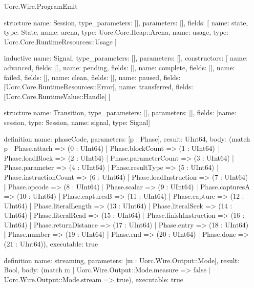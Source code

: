 \begin{lexlean}{Uorc.Wire.ProgramEmit}
\begin{semanticmodule}
structure{
  name: Session,
  type_parameters: [],
  parameters: [],
  fields: [
    {name: state, type: State},
    {name: arena, type: Uorc.Core.Heap::Arena},
    {name: usage, type: Uorc.Core.RuntimeResources::Usage}
  ]
}

inductive{
  name: Signal,
  type_parameters: [],
  parameters: [],
  constructors: [
    {name: advanced, fields: []},
    {name: pending, fields: []},
    {name: complete, fields: []},
    {name: failed, fields: []},
    {name: clean, fields: []},
    {name: paused, fields: [Uorc.Core.RuntimeResources::Error]},
    {name: transferred, fields: [Uorc.Core.RuntimeValue::Handle]}
  ]
}

structure{
  name: Transition,
  type_parameters: [],
  parameters: [],
  fields: [{name: session, type: Session}, {name: signal, type: Signal}]
}

definition{
  name: phaseCode,
  parameters: [p : Phase],
  result: UInt64,
  body: (match p
    | Phase.attach => (0 : UInt64)
    | Phase.blockCount => (1 : UInt64)
    | Phase.loadBlock => (2 : UInt64)
    | Phase.parameterCount => (3 : UInt64)
    | Phase.parameter => (4 : UInt64)
    | Phase.resultType => (5 : UInt64)
    | Phase.instructionCount => (6 : UInt64)
    | Phase.loadInstruction => (7 : UInt64)
    | Phase.opcode => (8 : UInt64)
    | Phase.scalar => (9 : UInt64)
    | Phase.capturesA => (10 : UInt64)
    | Phase.capturesB => (11 : UInt64)
    | Phase.capture => (12 : UInt64)
    | Phase.literalLength => (13 : UInt64)
    | Phase.literalSeek => (14 : UInt64)
    | Phase.literalRead => (15 : UInt64)
    | Phase.finishInstruction => (16 : UInt64)
    | Phase.returnDistance => (17 : UInt64)
    | Phase.entry => (18 : UInt64)
    | Phase.number => (19 : UInt64)
    | Phase.end => (20 : UInt64)
    | Phase.done => (21 : UInt64)),
  executable: true
}

definition{
  name: streaming,
  parameters: [m : Uorc.Wire.Output::Mode],
  result: Bool,
  body: (match m | Uorc.Wire.Output::Mode.measure => false | Uorc.Wire.Output::Mode.stream => true),
  executable: true
}


\end{semanticmodule}
\end{lexlean}
